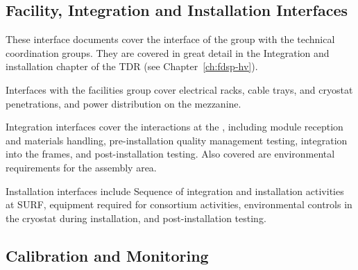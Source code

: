 
\subsection{Facility, Integration and Installation Interfaces}

These interface documents cover the interface of the  group with the technical coordination groups.  They are covered in great detail in the Integration and installation chapter of the TDR (see Chapter~\ref{ch:fdsp-hv}).


Interfaces with the facilities group cover electrical racks, cable trays, and cryostat penetrations, and power distribution on the mezzanine.

Integration interfaces cover the interactions at the , including  module reception and materials handling, pre-installation quality management testing, integration into the  frames, and post-installation testing.  Also covered are environmental requirements for the assembly area.

Installation interfaces include Sequence of integration and installation activities at SURF, equipment required for  consortium activities, environmental controls in the cryostat during installation, and post-installation testing.


\subsection{Calibration and Monitoring}
\label{sec:fdsp-pd-intfc-calib}




